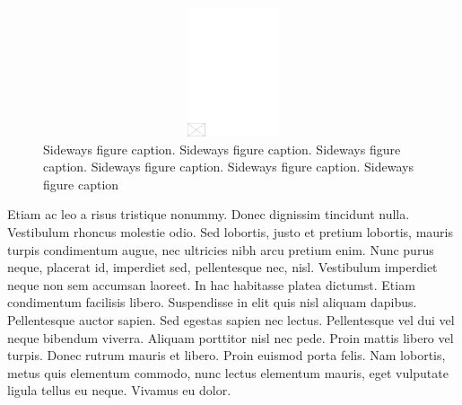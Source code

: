 \documentclass[CJCE,STIX2COL]{WileyNJD-v2}
\begin{document}
\begin{figure}
\centerline{\includegraphics[width=542pt,height=9pc,draft]{empty}}
\caption{Sideways figure caption. Sideways figure caption. Sideways figure caption. Sideways figure caption. Sideways figure caption. Sideways figure caption\label{fig3}}
\end{figure}

Etiam ac leo a risus tristique nonummy. Donec dignissim tincidunt nulla. Vestibulum rhoncus molestie odio. Sed
lobortis, justo et pretium lobortis, mauris turpis condimentum augue, nec ultricies nibh arcu pretium enim. Nunc
purus neque, placerat id, imperdiet sed, pellentesque nec, nisl. Vestibulum imperdiet neque non sem accumsan laoreet.
In hac habitasse platea dictumst. Etiam condimentum facilisis libero. Suspendisse in elit quis nisl aliquam dapibus.
Pellentesque auctor sapien. Sed egestas sapien nec lectus. Pellentesque vel dui vel neque bibendum viverra. Aliquam
porttitor nisl nec pede. Proin mattis libero vel turpis. Donec rutrum mauris et libero. Proin euismod porta felis.
Nam lobortis, metus quis elementum commodo, nunc lectus elementum mauris, eget vulputate ligula tellus eu neque.
Vivamus eu dolor.
\end{document}
